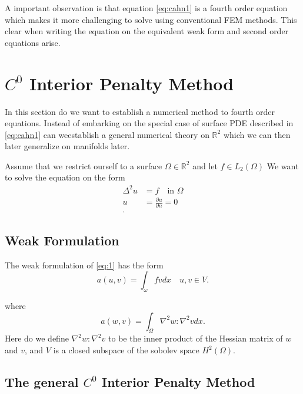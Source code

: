 A important observation is that equation \eqref{eq:cahn1} is a fourth order equation which makes it more challenging to
solve using conventional FEM methods. This clear when writing the equation on the equivalent weak form and second order
equations arise.


\section{$C^0$ Interior Penalty Method}
\label{sec:ch1}

In this section do we want to establish a numerical method to fourth order equations. Instead of embarking on the
special case of surface PDE described in \eqref{eq:cahn1} can weestablish a general numerical theory on $\mathbb{R} ^2$ which we can then later generalize on manifolds later.   

Assume that we restrict ourself to a surface $\Omega \in \mathbb{R} ^2 $ and let $f \in L_{2}\left( \Omega  \right)$   
We want to solve the equation on the form
\begin{align}
    \label{eq:1}
    \Delta^{2} u &= f \quad \text{in } \Omega  \\
    u &= \frac{\partial u}{\partial n} = 0  \\
.\end{align}

\subsection{Weak Formulation}%
\label{sub:weak_formulation}


The weak formulation of \eqref{eq:1} has the form
\begin{equation}
\label{eq:2}
    a\left( u,v \right) = \int_{\omega}^{} f v dx \quad u,v \in V
.\end{equation}

where
\begin{equation}
\label{eq:3}
    a\left( w,v \right) = \int_{\Omega }^{} \nabla ^2 w : \nabla ^2 v dx
.\end{equation}
Here do we define $\nabla ^2 w : \nabla ^2 v $ to be the inner product of the Hessian matrix of $w$  and $v$, and $V$
is a closed subspace of the sobolev space $H^2\left( \Omega  \right)$.


\subsection{The general $C^0$ Interior Penalty Method}%
\label{sub:_c_0_interior_penalty_method}


